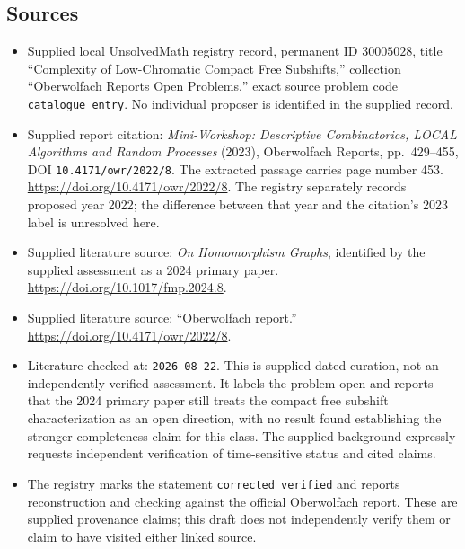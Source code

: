 \documentclass[11pt]{article}
\begin{document}
\subsection{Sources}
\begin{itemize}
\item Supplied local UnsolvedMath registry record, permanent ID \(30005028\), title ``Complexity of Low-Chromatic Compact Free Subshifts,'' collection ``Oberwolfach Reports Open Problems,'' exact source problem code \texttt{catalogue entry}. No individual proposer is identified in the supplied record.
\item Supplied report citation: \emph{Mini-Workshop: Descriptive Combinatorics, LOCAL Algorithms and Random Processes} (2023), Oberwolfach Reports, pp.~429--455, DOI \texttt{10.4171/owr/2022/8}. The extracted passage carries page number 453. \url{https://doi.org/10.4171/owr/2022/8}. The registry separately records proposed year 2022; the difference between that year and the citation's 2023 label is unresolved here.
\item Supplied literature source: \emph{On Homomorphism Graphs}, identified by the supplied assessment as a 2024 primary paper. \url{https://doi.org/10.1017/fmp.2024.8}.
\item Supplied literature source: ``Oberwolfach report.'' \url{https://doi.org/10.4171/owr/2022/8}.
\item Literature checked at: \texttt{2026-08-22}. This is supplied dated curation, not an independently verified assessment. It labels the problem open and reports that the 2024 primary paper still treats the compact free subshift characterization as an open direction, with no result found establishing the stronger completeness claim for this class. The supplied background expressly requests independent verification of time-sensitive status and cited claims.
\item The registry marks the statement \texttt{corrected\_verified} and reports reconstruction and checking against the official Oberwolfach report. These are supplied provenance claims; this draft does not independently verify them or claim to have visited either linked source.
\end{itemize}
\end{document}
